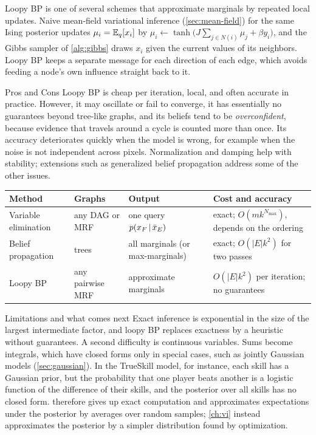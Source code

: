 \begin{remark}
Loopy BP is one of several schemes that approximate marginals by repeated local updates. Naive mean-field variational inference (\cref{sec:mean-field}) for the same Ising posterior updates $\mu_i=\mathbb{E}_q[x_i]$ by $\mu_i\gets\tanh\big(J\sum_{j\in N(i)}\mu_j+\beta y_i\big)$, and the Gibbs sampler of \cref{alg:gibbs} draws $x_i$ given the current values of its neighbors. Loopy BP keeps a separate message for each direction of each edge, which avoids feeding a node's own influence straight back to it.
\end{remark}

\begin{notebox}{Pros and Cons}
Loopy BP is cheap per iteration, local, and often accurate in practice. However, it may oscillate or fail to converge, it has essentially no guarantees beyond tree-like graphs, and its beliefs tend to be \emph{overconfident}, because evidence that travels around a cycle is counted more than once. Its accuracy deteriorates quickly when the model is wrong, for example when the noise is not independent across pixels. Normalization and damping help with stability; extensions such as generalized belief propagation address some of the other issues.
\end{notebox}

\begin{center}
\small
\begin{tabularx}{\textwidth}{@{}l>{\raggedright\arraybackslash}X>{\raggedright\arraybackslash}X>{\raggedright\arraybackslash}X@{}}
\toprule
Method & Graphs & Output & Cost and accuracy \\
\midrule
Variable elimination & any DAG or MRF & one query $p(x_F\,|\,\bar x_E)$ & exact; $O(mk^{N_{\max}})$, depends on the ordering \\
Belief propagation & trees & all marginals (or max-marginals) & exact; $O(|E|k^2)$ for two passes \\
Loopy BP & any pairwise MRF & approximate marginals & $O(|E|k^2)$ per iteration; no guarantees \\
\bottomrule
\end{tabularx}
\end{center}

\begin{notebox}{Limitations and what comes next}
Exact inference is exponential in the size of the largest intermediate factor, and loopy BP replaces exactness by a heuristic without guarantees. A second difficulty is continuous variables. Sums become integrals, which have closed forms only in special cases, such as jointly Gaussian models (\cref{sec:gaussian}). In the TrueSkill model, for instance, each skill has a Gaussian prior, but the probability that one player beats another is a logistic function of the difference of their skills, and the posterior over all skills has no closed form.  therefore gives up exact computation and approximates expectations under the posterior by averages over random samples; \cref{ch:vi} instead approximates the posterior by a simpler distribution found by optimization.
\end{notebox}
